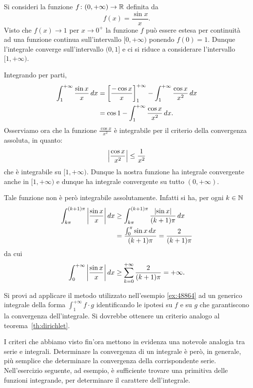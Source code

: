 \begin{example}
\label{ex:48864}%
\mymark{*}%
Si consideri la funzione $f\colon (0,+\infty) \to \mathbb R$
definita da
\[
  f(x) = \frac{\sin x }{x}.
\]
Visto che $f(x)\to 1$ per $x\to 0^+$ la funzione $f$
può essere estesa per continuità ad una funzione continua sull'intervallo
$[0,+\infty)$ ponendo $f(0)=1$.
Dunque l'integrale converge sull'intervallo $(0,1]$ e ci si
riduce a considerare l'intervallo $[1,+\infty)$.

Integrando per parti,
\begin{align*}
  \int_1^{+\infty} \frac{\sin x}{x}\, dx
  &= {\left[ \frac{-\cos x}{x} \right]}_1^{+\infty} -
  \int_1^{+\infty} \frac{\cos x}{x^2} \, dx \\
  &= \cos 1 - \int_1^{+\infty} \frac{\cos x}{x^2}\, dx.
\end{align*}
Osserviamo ora che la funzione $\frac{\cos x}{x^2}$ è integrabile
per il criterio della convergenza assoluta, in quanto:
\[
  {\left|\frac{\cos x}{x^2}\right|} \le \frac{1}{x^2}
\]
che è integrabile su $[1,+\infty)$.
Dunque la nostra funzione ha integrale convergente anche in $[1,+\infty)$
e dunque ha integrale convergente su tutto $(0,+\infty)$.

Tale funzione non è però integrabile assolutamente.
Infatti si ha,
per ogni $k\in \mathbb N$
\begin{align*}
  \int_{k\pi}^{(k+1)\pi} {\left|\frac{\sin x} x\right|}\, dx
  &\ge \int_{k\pi}^{(k+1)\pi} \frac{{\left|\sin x\right|}}{(k+1)\pi}\, dx\\
  &= \frac{\int_0^\pi \sin x \, dx}{(k+1)\pi}
  = \frac{2}{(k+1)\pi}
\end{align*}
da cui
\[
  \int_0^{+\infty} {\left|\frac{\sin x}{x}\right|}\, dx
  \ge \sum_{k=0}^{+\infty} \frac{2}{(k+1)\pi} = +\infty.
\]
\end{example}

\begin{exercise}
  Si provi ad applicare il metodo utilizzato nell'esempio \ref{ex:48864} ad 
  un generico integrale della forma $\int_1^{+\infty} f\cdot g$ identificando le ipotesi 
  su $f$ e su $g$ che garantiscono la convergenza dell'integrale.
  Si dovrebbe ottenere un criterio analogo al teorema~\ref{th:dirichlet}.
\end{exercise}


I criteri che abbiamo visto fin'ora mettono in evidenza una notevole
analogia tra serie e integrali. Determinare la convergenza
di un integrale è però, in generale, più semplice che determinare
la convergenza della corrispondente serie.
Nell'esercizio seguente, ad esempio, è sufficiente trovare una primitiva
delle funzioni integrande, per determinare il carattere dell'integrale.

